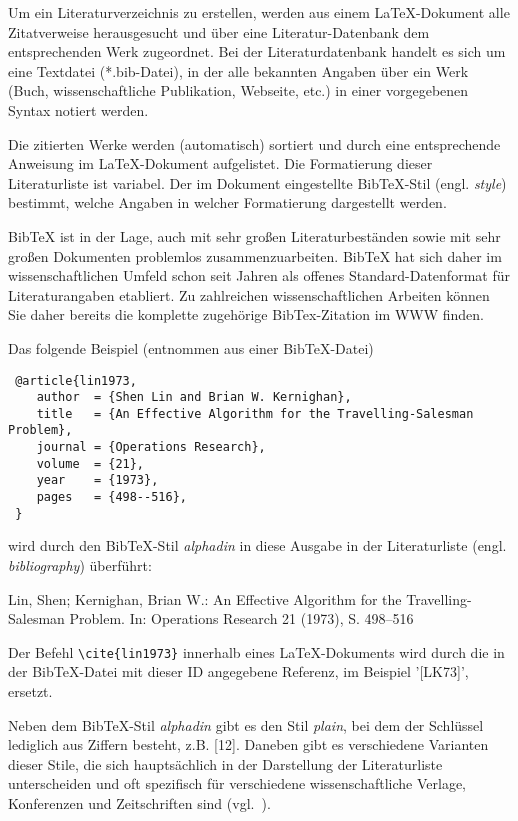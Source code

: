 Um ein Literaturverzeichnis zu erstellen, werden aus einem \LaTeX-Dokument alle Zitatverweise herausgesucht und über eine Literatur-Datenbank dem entsprechenden Werk zugeordnet. Bei der Literaturdatenbank handelt es sich um eine Textdatei (*.bib-Datei), in der alle bekannten Angaben über ein Werk (Buch, wissenschaftliche Publikation, Webseite, etc.) in einer vorgegebenen Syntax notiert werden.

\smallskip

Die zitierten Werke werden (automatisch) sortiert und durch eine entsprechende Anweisung im \LaTeX-Dokument aufgelistet. 
Die Formatierung dieser Literaturliste ist variabel. 
Der im Dokument eingestellte BibTeX-Stil (engl. {\em style}) bestimmt, welche Angaben in welcher Formatierung dargestellt werden.

\smallskip

BibTeX ist in der Lage, auch mit sehr großen Literaturbeständen sowie mit sehr großen Dokumenten problemlos zusammenzuarbeiten. 
BibTeX hat sich daher im wissenschaftlichen Umfeld schon seit Jahren als offenes Standard-Datenformat für Literaturangaben etabliert.
Zu zahlreichen wissenschaftlichen Arbeiten können Sie daher bereits die komplette zugehörige BibTex-Zitation im WWW finden.

\smallskip

Das folgende Beispiel (entnommen aus einer BibTeX-Datei)

\begin{verbatim}
 @article{lin1973,
    author  = {Shen Lin and Brian W. Kernighan},
    title   = {An Effective Algorithm for the Travelling-Salesman Problem},
    journal = {Operations Research},
    volume  = {21},
    year    = {1973},
    pages   = {498--516},
 }
\end{verbatim}

wird durch den BibTeX-Stil {\em alphadin} in diese Ausgabe in der Literaturliste (engl. {\em bibliography}) überführt:

\bigskip
[LK73] Lin, Shen; Kernighan, Brian W.: An Effective Algorithm for the Travelling-Salesman Problem. In: Operations Research 21 (1973), S. 498--516
\bigskip

Der Befehl \verb+\cite{lin1973}+ innerhalb eines LaTeX-Dokuments wird durch die in der BibTeX-Datei mit dieser ID angegebene Referenz, im Beispiel '[LK73]', ersetzt.

\smallskip

Neben dem BibTeX-Stil {\em alphadin} gibt es den Stil {\em plain}, bei dem der Schlüssel lediglich aus Ziffern besteht, z.B. [12]. Daneben gibt es verschiedene Varianten dieser Stile, die sich hauptsächlich in der Darstellung der Literaturliste unterscheiden und oft spezifisch für verschiedene wissenschaftliche Verlage, Konferenzen und Zeitschriften sind (vgl.~\cite{bibstyle}).

